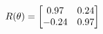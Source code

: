 \documentclass[preview]{standalone}
\begin{document}
\begin{align*}
\special{dvisvgm:raw <g id='unique000'>}R(\theta) = \begin{bmatrix}0.97 & 0.24\\-0.24 & 0.97\end{bmatrix}\special{dvisvgm:raw </g>}
\end{align*}
\end{document}
